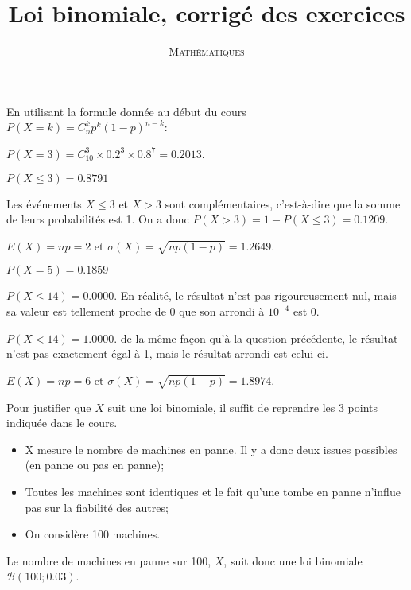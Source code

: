 \documentclass[a4paper,12pt]{scrartcl}
\date{}
\title{Loi binomiale, corrigé des exercices}
\author{\textsc{Mathématiques}}
\begin{document}
\maketitle



\question{}
En utilisant la formule donnée au début du cours $P(X=k) = C_n^k p^k (1-p)^{n-k}$:

$P(X=3) = C_{10}^3 \times 0.2^3 \times 0.8^7 = 0.2013$.

\question{}
$P(X \leqslant 3) = 0.8791$

\question{}
Les événements $X \leqslant 3$ et $X>3$ sont complémentaires, c'est-à-dire que la somme de leurs probabilités est 1. On a donc $P(X>3) = 1 - P(X \leqslant 3) = 0.1209$.

\question{}
$E(X) = np = 2$ et $\sigma(X) = \sqrt{np(1-p)} = 1.2649$.


\question{}
$P(X = 5) = 0.1859$

\question{}
$P(X \leqslant 14) = 0.0000$. En réalité, le résultat n'est pas rigoureusement nul, mais sa valeur est tellement proche de 0 que son arrondi à $10^{-4}$ est 0.

\question{}
$P(X < 14) = 1.0000$. de la même façon qu'à la question précédente, le résultat n'est pas exactement égal à 1, mais le résultat arrondi est celui-ci.

\question{}
$E(X) = np = 6$ et $\sigma(X) = \sqrt{np(1-p)} = 1.8974$.


\question{}

Pour justifier que $X$ suit une loi binomiale, il suffit de reprendre les 3 points indiquée dans le cours.

\begin{itemize}
    \item X mesure le nombre de machines en panne. Il y a donc deux issues possibles (en panne ou pas en panne);
    \item Toutes les machines sont identiques et le fait qu'une tombe en panne n'influe pas sur la fiabilité des autres;
    \item On considère 100 machines.
\end{itemize}

Le nombre de machines en panne sur 100, $X$, suit donc une loi binomiale $\mathcal{B}(100;0.03)$.
\end{document}
